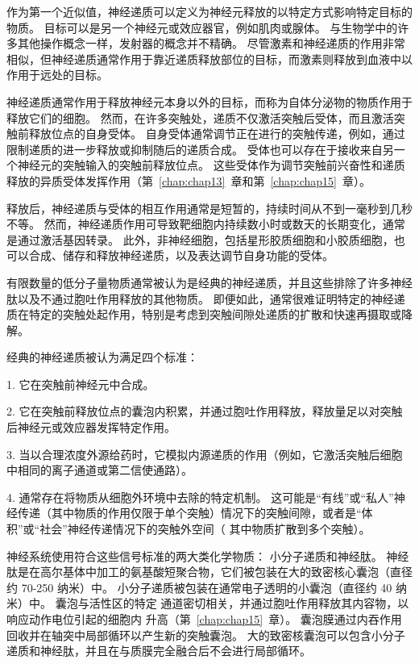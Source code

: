 作为第一个近似值，神经递质可以定义为神经元释放的以特定方式影响特定目标的物质。
目标可以是另一个神经元或效应器官，例如肌肉或腺体。 
与生物学中的许多其他操作概念一样，发射器的概念并不精确。
尽管激素和神经递质的作用非常相似，但神经递质通常作用于靠近递质释放部位的目标，而激素则释放到血液中以作用于远处的目标。


神经递质通常作用于释放神经元本身以外的目标，而称为自体分泌物的物质作用于释放它们的细胞。
然而，在许多突触处，递质不仅激活突触后受体，而且激活突触前释放位点的自身受体。
自身受体通常调节正在进行的突触传递，例如，通过限制递质的进一步释放或抑制随后的递质合成。
受体也可以存在于接收来自另一个神经元的突触输入的突触前释放位点。
这些受体作为调节突触前兴奋性和递质释放的异质受体发挥作用（第~\ref{chap:chap13}~章和第~\ref{chap:chap15}~章）。


释放后，神经递质与受体的相互作用通常是短暂的，持续时间从不到一毫秒到几秒不等。
然而，神经递质作用可导致靶细胞内持续数小时或数天的长期变化，通常是通过激活基因转录。
此外，非神经细胞，包括星形胶质细胞和小胶质细胞，也可以合成、储存和释放神经递质，以及表达调节自身功能的受体。


有限数量的低分子量物质通常被认为是经典的神经递质，并且这些排除了许多神经肽以及不通过胞吐作用释放的其他物质。
即便如此，通常很难证明特定的神经递质在特定的突触处起作用，特别是考虑到突触间隙处递质的扩散和快速再摄取或降解。


经典的神经递质被认为满足四个标准：

1. 它在突触前神经元中合成。

2. 它在突触前释放位点的囊泡内积累，并通过胞吐作用释放，释放量足以对突触后神经元或效应器发挥特定作用。

3. 当以合理浓度外源给药时，它模拟内源递质的作用（例如，它激活突触后细胞中相同的离子通道或第二信使通路）。

4. 通常存在将物质从细胞外环境中去除的特定机制。 这可能是“有线”或“私人”神经传递（其中物质的作用仅限于单个突触）情况下的突触间隙，或者是“体积”或“社会”神经传递情况下的突触外空间（ 其中物质扩散到多个突触）。


神经系统使用符合这些信号标准的两大类化学物质：
小分子递质和神经肽。
神经肽是在高尔基体中加工的氨基酸短聚合物，它们被包装在大的致密核心囊泡（直径约 70-250 纳米）中。
小分子递质被包装在通常电子透明的小囊泡（直径约 40 纳米）中。
囊泡与活性区的特定  通道密切相关，并通过胞吐作用释放其内容物，以响应动作电位引起的细胞内  升高（第~\ref{chap:chap15}~章）。
囊泡膜通过内吞作用回收并在轴突中局部循环以产生新的突触囊泡。
大的致密核囊泡可以包含小分子递质和神经肽，并且在与质膜完全融合后不会进行局部循环。



